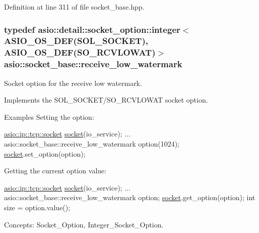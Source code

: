 Definition at line 311 of file socket\+\_\+base.\+hpp.

\hypertarget{classasio_1_1socket__base_acc8a5f622e3b8345e5aa2c4c733bd0fa}{}
\subsubsection[{receive\+\_\+low\+\_\+watermark}]{\setlength{\rightskip}{0pt plus 5cm}typedef {\bf asio\+::detail\+::socket\+\_\+option\+::integer}$<$ {\bf A\+S\+I\+O\+\_\+\+O\+S\+\_\+\+D\+E\+F}(S\+O\+L\+\_\+\+S\+O\+C\+K\+E\+T), {\bf A\+S\+I\+O\+\_\+\+O\+S\+\_\+\+D\+E\+F}(S\+O\+\_\+\+R\+C\+V\+L\+O\+W\+A\+T)$>$ {\bf asio\+::socket\+\_\+base\+::receive\+\_\+low\+\_\+watermark}}\label{classasio_1_1socket__base_acc8a5f622e3b8345e5aa2c4c733bd0fa}


Socket option for the receive low watermark. 

Implements the S\+O\+L\+\_\+\+S\+O\+C\+K\+E\+T/\+S\+O\+\_\+\+R\+C\+V\+L\+O\+W\+A\+T socket option.

\begin{DoxyParagraph}{Examples}
Setting the option\+: 
\begin{DoxyCode}
\hyperlink{classasio_1_1basic__stream__socket}{asio::ip::tcp::socket} \hyperlink{namespacewebsocketpp_1_1transport_1_1asio_1_1socket_1_1error_a828ddaa5ed63a761e1b557465a35f05aa0c31b356014843e1d09514e794a539a7}{socket}(io\_service); 
...
asio::socket\_base::receive\_low\_watermark option(1024);
\hyperlink{namespacewebsocketpp_1_1transport_1_1asio_1_1socket_1_1error_a828ddaa5ed63a761e1b557465a35f05aa0c31b356014843e1d09514e794a539a7}{socket}.set\_option(option);
\end{DoxyCode}

\end{DoxyParagraph}
\begin{DoxyParagraph}{}
Getting the current option value\+: 
\begin{DoxyCode}
\hyperlink{classasio_1_1basic__stream__socket}{asio::ip::tcp::socket} \hyperlink{namespacewebsocketpp_1_1transport_1_1asio_1_1socket_1_1error_a828ddaa5ed63a761e1b557465a35f05aa0c31b356014843e1d09514e794a539a7}{socket}(io\_service); 
...
asio::socket\_base::receive\_low\_watermark option;
\hyperlink{namespacewebsocketpp_1_1transport_1_1asio_1_1socket_1_1error_a828ddaa5ed63a761e1b557465a35f05aa0c31b356014843e1d09514e794a539a7}{socket}.get\_option(option);
\textcolor{keywordtype}{int} size = option.value();
\end{DoxyCode}

\end{DoxyParagraph}
\begin{DoxyParagraph}{Concepts\+:}
Socket\+\_\+\+Option, Integer\+\_\+\+Socket\+\_\+\+Option. 
\end{DoxyParagraph}


